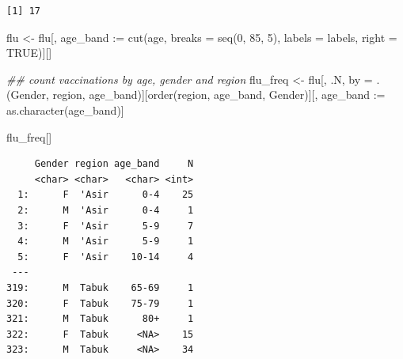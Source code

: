 \documentclass[
  letterpaper,
  DIV=11,
  numbers=noendperiod]{scrreprt}
\newenvironment{Shaded}{\begin{snugshade}}{\end{snugshade}}
\newcommand{\AttributeTok}[1]{\textcolor[rgb]{0.40,0.45,0.13}{#1}}
\newcommand{\ConstantTok}[1]{\textcolor[rgb]{0.56,0.35,0.01}{#1}}
\newcommand{\DecValTok}[1]{\textcolor[rgb]{0.68,0.00,0.00}{#1}}
\newcommand{\DocumentationTok}[1]{\textcolor[rgb]{0.37,0.37,0.37}{\textit{#1}}}
\newcommand{\ErrorTok}[1]{\textcolor[rgb]{0.68,0.00,0.00}{#1}}
\newcommand{\FunctionTok}[1]{\textcolor[rgb]{0.28,0.35,0.67}{#1}}
\newcommand{\NormalTok}[1]{\textcolor[rgb]{0.00,0.23,0.31}{#1}}
\newcommand{\OtherTok}[1]{\textcolor[rgb]{0.00,0.23,0.31}{#1}}
\newcommand{\SpecialCharTok}[1]{\textcolor[rgb]{0.37,0.37,0.37}{#1}}
\newcommand{\StringTok}[1]{\textcolor[rgb]{0.13,0.47,0.30}{#1}}
\begin{document}
\begin{verbatim}
[1] 17
\end{verbatim}

\begin{Shaded}
\begin{Highlighting}[]
\NormalTok{flu }\OtherTok{\textless{}{-}}\NormalTok{ flu[, age\_band }\SpecialCharTok{:}\ErrorTok{=} \FunctionTok{cut}\NormalTok{(age, }\AttributeTok{breaks =} \FunctionTok{seq}\NormalTok{(}\DecValTok{0}\NormalTok{, }\DecValTok{85}\NormalTok{, }\DecValTok{5}\NormalTok{), }\AttributeTok{labels =}\NormalTok{ labels,  }\AttributeTok{right =} \ConstantTok{TRUE}\NormalTok{)][]}

\DocumentationTok{\#\# count vaccinations by age, gender and region}
\NormalTok{flu\_freq }\OtherTok{\textless{}{-}}\NormalTok{ flu[, .N, by }\OtherTok{=}\NormalTok{ .(Gender, region, age\_band)][}\FunctionTok{order}\NormalTok{(region, age\_band, Gender)][, age\_band }\SpecialCharTok{:}\ErrorTok{=} \FunctionTok{as.character}\NormalTok{(age\_band)]}

\NormalTok{flu\_freq[]}
\end{Highlighting}
\end{Shaded}

\begin{verbatim}
     Gender region age_band     N
     <char> <char>   <char> <int>
  1:      F  'Asir      0-4    25
  2:      M  'Asir      0-4     1
  3:      F  'Asir      5-9     7
  4:      M  'Asir      5-9     1
  5:      F  'Asir    10-14     4
 ---                             
319:      M  Tabuk    65-69     1
320:      F  Tabuk    75-79     1
321:      M  Tabuk      80+     1
322:      F  Tabuk     <NA>    15
323:      M  Tabuk     <NA>    34
\end{verbatim}

\begin{Shaded}
\end{Shaded}
\end{document}
